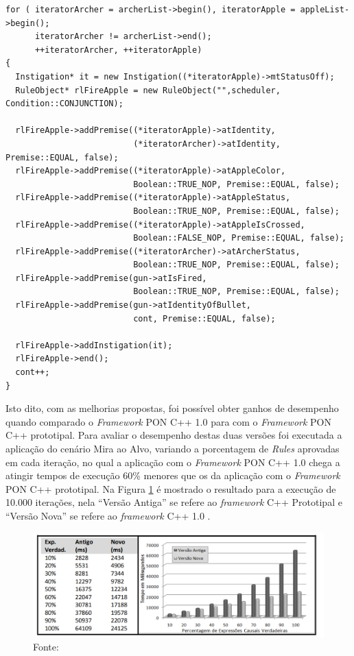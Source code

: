 \begin{lstlisting}[caption = {Exemplo de programa com o \textit{framework} C++ 1.0},
source = {Adaptado de \citeonline{msc_Banaszewski_2009}},
   label = {cod:fw1_ex}, float=htb]
for ( iteratorArcher = archerList->begin(), iteratorApple = appleList->begin(); 
      iteratorArcher != archerList->end();
      ++iteratorArcher, ++iteratorApple)
{	
  Instigation* it = new Instigation((*iteratorApple)->mtStatusOff);
  RuleObject* rlFireApple = new RuleObject("",scheduler, Condition::CONJUNCTION);

  rlFireApple->addPremise((*iteratorApple)->atIdentity,
                          (*iteratorArcher)->atIdentity, Premise::EQUAL, false);
  rlFireApple->addPremise((*iteratorApple)->atAppleColor,
                          Boolean::TRUE_NOP, Premise::EQUAL, false);
  rlFireApple->addPremise((*iteratorApple)->atAppleStatus,
                          Boolean::TRUE_NOP, Premise::EQUAL, false);
  rlFireApple->addPremise((*iteratorApple)->atAppleIsCrossed,
                          Boolean::FALSE_NOP, Premise::EQUAL, false);
  rlFireApple->addPremise((*iteratorArcher)->atArcherStatus,
                          Boolean::TRUE_NOP, Premise::EQUAL, false);
  rlFireApple->addPremise(gun->atIsFired,
                          Boolean::TRUE_NOP, Premise::EQUAL, false);
  rlFireApple->addPremise(gun->atIdentityOfBullet,
                          cont, Premise::EQUAL, false);

  rlFireApple->addInstigation(it);
  rlFireApple->end();
  cont++;
}
\end{lstlisting}

Isto dito, com as melhorias propostas, foi possível obter ganhos de desempenho
quando comparado o \textit{Framework} PON C++ 1.0  para com o \textit{Framework}
PON C++ prototipal. Para avaliar o desempenho destas duas versões foi executada
a aplicação do cenário Mira ao Alvo, variando a porcentagem de \textit{Rules}
aprovadas em cada iteração, no qual a aplicação com o \textit{Framework} PON C++
1.0 chega a atingir tempos de execução 60\% menores que os da aplicação com o
\textit{Framework} PON C++ prototipal. Na Figura \ref{fig:fw1_vs_prot} é
mostrado o resultado para a execução de 10.000 iterações, nela \enquote{Versão Antiga}
se refere ao \textit{framework} C++ Prototipal e \enquote{Versão Nova} se refere ao
\textit{framework} C++ 1.0 \cite{msc_Banaszewski_2009}.

\begin{figure}[!htb]
  \centering
  \includegraphics[width=\textwidth]{../figures/fw1_vs_prot.png}
  \caption{Comparação do desempenho do \textit{framework} C++ 1.0 com o
  \textit{framework} C++ Prototipal} \caption*{Fonte:
  }
  \label{fig:fw1_vs_prot}
\end{figure}

